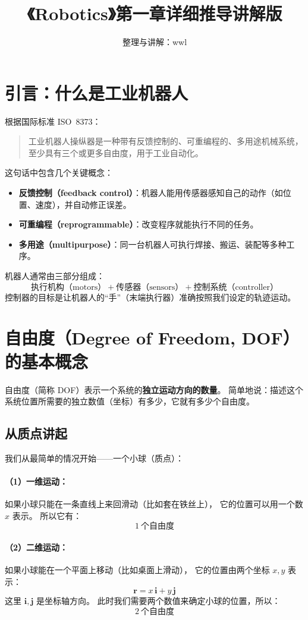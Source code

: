 \documentclass[12pt,a4paper]{article}
\title{《Robotics》第一章详细推导讲解版}
\author{整理与讲解：wwl}
\date{}
\begin{document}
\maketitle

\section{引言：什么是工业机器人}
根据国际标准 ISO~8373：
\begin{quote}
工业机器人操纵器是一种带有反馈控制的、可重编程的、多用途机械系统，至少具有三个或更多自由度，用于工业自动化。
\end{quote}

\noindent
这句话中包含几个关键概念：
\begin{itemize}
  \item \textbf{反馈控制（feedback control）}：机器人能用传感器感知自己的动作（如位置、速度），并自动修正误差。
  \item \textbf{可重编程（reprogrammable）}：改变程序就能执行不同的任务。
  \item \textbf{多用途（multipurpose）}：同一台机器人可执行焊接、搬运、装配等多种工序。
\end{itemize}

机器人通常由三部分组成：
\[
\text{执行机构（motors）} + \text{传感器（sensors）} + \text{控制系统（controller）}
\]
控制器的目标是让机器人的“手”（末端执行器）准确按照我们设定的轨迹运动。

\section{自由度（Degree of Freedom, DOF）的基本概念}
自由度（简称 DOF）表示一个系统的\textbf{独立运动方向的数量}。  
简单地说：描述这个系统位置所需要的独立数值（坐标）有多少，它就有多少个自由度。

\subsection{从质点讲起}
我们从最简单的情况开始——一个小球（质点）：

\paragraph{（1）一维运动：}
如果小球只能在一条直线上来回滑动（比如套在铁丝上），
它的位置可以用一个数 \(x\) 表示。  
所以它有：
\[
\boxed{1\ \text{个自由度}}
\]

\paragraph{（2）二维运动：}
如果小球能在一个平面上移动（比如桌面上滑动），
它的位置由两个坐标 \(x, y\) 表示：
\[
\boldsymbol{r} = x\,\boldsymbol{i} + y\,\boldsymbol{j}
\]
这里 \(\boldsymbol{i},\boldsymbol{j}\) 是坐标轴方向。  
此时我们需要两个数值来确定小球的位置，所以：
\[
\boxed{2\ \text{个自由度}}
\]
\end{document}
